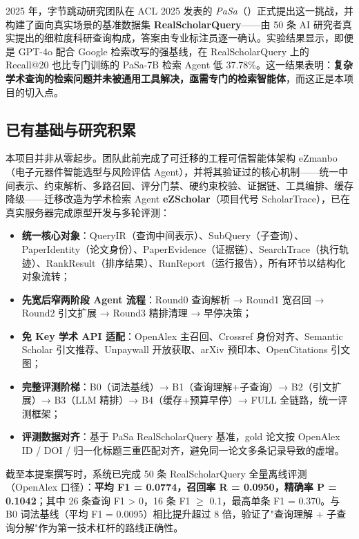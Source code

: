 \documentclass[11pt,a4paper,fontset=macnew]{ctexart}
\begin{document}
2025 年，字节跳动研究团队在 ACL 2025 发表的 \emph{PaSa}（\cite{pasa2025}）正式提出这一挑战，并构建了面向真实场景的基准数据集 \textbf{RealScholarQuery}——由 50 条 AI 研究者真实提出的细粒度科研查询构成，答案由专业标注员逐一确认。实验结果显示，即便是 GPT-4o 配合 Google 检索改写的强基线，在 RealScholarQuery 上的 Recall@20 也比专门训练的 PaSa-7B 检索 Agent 低 37.78\%。这一结果表明：\textbf{复杂学术查询的检索问题并未被通用工具解决，亟需专门的检索智能体}，而这正是本项目的切入点。

\subsection{已有基础与研究积累}
\label{sec:foundation}

本项目并非从零起步。团队此前完成了可迁移的工程可信智能体架构 eZmanbo（电子元器件智能选型与风险评估 Agent），并将其验证过的核心机制——统一中间表示、约束解析、多路召回、评分门禁、硬约束校验、证据链、工具编排、缓存降级——迁移改造为学术检索 Agent \textbf{eZScholar}（项目代号 ScholarTrace），已在真实服务器完成原型开发与多轮评测：

\begin{itemize}
  \item \textbf{统一核心对象}：QueryIR（查询中间表示）、SubQuery（子查询）、PaperIdentity（论文身份）、PaperEvidence（证据链）、SearchTrace（执行轨迹）、RankResult（排序结果）、RunReport（运行报告），所有环节以结构化对象流转；
  \item \textbf{先宽后窄两阶段 Agent 流程}：Round0 查询解析 → Round1 宽召回 → Round2 引文扩展 → Round3 精排清理 → 早停决策；
  \item \textbf{免 Key 学术 API 适配}：OpenAlex 主召回、Crossref 身份对齐、Semantic Scholar 引文推荐、Unpaywall 开放获取、arXiv 预印本、OpenCitations 引文图；
  \item \textbf{完整评测阶梯}：B0（词法基线）→ B1（查询理解+子查询）→ B2（引文扩展）→ B3（LLM 精排）→ B4（缓存+预算早停）→ FULL 全链路，统一评测框架；
  \item \textbf{评测数据对齐}：基于 PaSa RealScholarQuery 基准，gold 论文按 OpenAlex ID / DOI / 归一化标题三重匹配对齐，避免同一论文多条记录导致的虚增。
\end{itemize}

截至本提案撰写时，系统已完成 50 条 RealScholarQuery 全量离线评测（OpenAlex 口径）：\textbf{平均 F1 = 0.0774，召回率 R = 0.0950，精确率 P = 0.1042}；其中 26 条查询 F1 > 0，16 条 F1 $\geq$ 0.1，最高单条 F1 = 0.370。与 B0 词法基线（平均 F1 = 0.0095）相比提升超过 8 倍，验证了"查询理解 + 子查询分解"作为第一技术杠杆的路线正确性。
\end{document}
